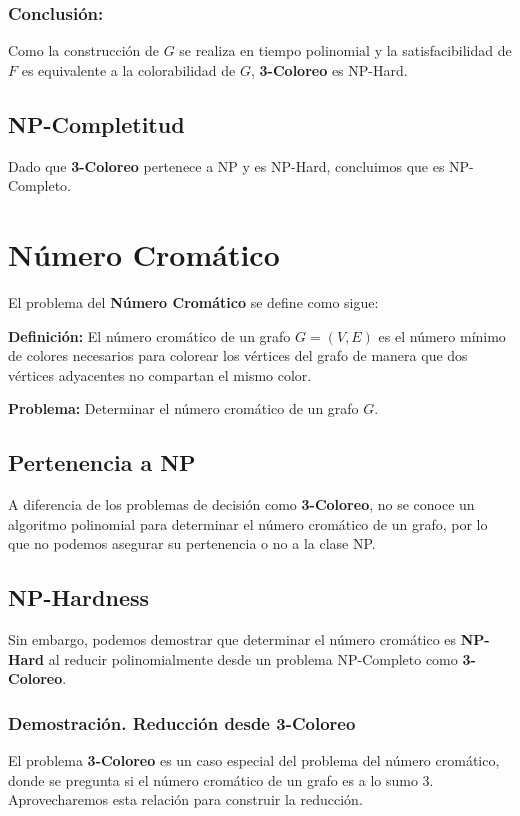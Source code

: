 \documentclass[a4paper,12pt]{article}
\begin{document}
\subsubsection{Conclusi\'on:} Como la construcci\'on de $G$ se realiza en tiempo polinomial y la satisfacibilidad de $F$ es equivalente a la colorabilidad de $G$, \textbf{3-Coloreo} es NP-Hard.

\subsection{NP-Completitud}
Dado que \textbf{3-Coloreo} pertenece a NP y es NP-Hard, concluimos que es NP-Completo.




\section{N\'umero Crom\'atico}

El problema del \textbf{N\'umero Crom\'atico} se define como sigue:

\textbf{Definici\'on:} El n\'umero crom\'atico de un grafo $G = (V, E)$ es el n\'umero m\'inimo de colores necesarios para colorear los v\'ertices del grafo de manera que dos v\'ertices adyacentes no compartan el mismo color.

\textbf{Problema:} Determinar el n\'umero crom\'atico de un grafo $G$.

\subsection{Pertenencia a NP}

A diferencia de los problemas de decisi\'on como \textbf{3-Coloreo}, no se conoce un algoritmo polinomial para determinar el n\'umero crom\'atico de un grafo, por lo que no podemos asegurar su pertenencia o no a la clase NP.


\subsection{NP-Hardness}

Sin embargo, podemos demostrar que determinar el n\'umero crom\'atico es \textbf{NP-Hard} al reducir polinomialmente desde un problema NP-Completo como \textbf{3-Coloreo}.


\subsubsection{Demostración. Reducci\'on desde 3-Coloreo}
El problema \textbf{3-Coloreo} es un caso especial del problema del n\'umero crom\'atico, donde se pregunta si el n\'umero crom\'atico de un grafo es a lo sumo 3. Aprovecharemos esta relaci\'on para construir la reducci\'on.
\end{document}
